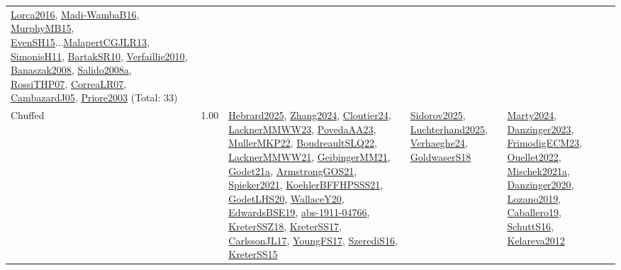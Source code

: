 {\begin{longtable}{p{3cm}r>{\raggedright\arraybackslash}p{6cm}>{\raggedright\arraybackslash}p{6cm}>{\raggedright\arraybackslash}p{8cm}}
\hyperref[detail:Lorca2016]{Lorca2016}, \hyperref[detail:Madi-WambaB16]{Madi-WambaB16}, \hyperref[detail:MurphyMB15]{MurphyMB15}, \hyperref[detail:EvenSH15]{EvenSH15}...\hyperref[detail:MalapertCGJLR13]{MalapertCGJLR13}, \hyperref[detail:SimonisH11]{SimonisH11}, \hyperref[detail:BartakSR10]{BartakSR10}, \hyperref[detail:Verfaillie2010]{Verfaillie2010}, \hyperref[detail:Banaszak2008]{Banaszak2008}, \hyperref[detail:Salido2008a]{Salido2008a}, \hyperref[detail:RossiTHP07]{RossiTHP07}, \hyperref[detail:CorreaLR07]{CorreaLR07}, \hyperref[detail:CambazardJ05]{CambazardJ05}, \hyperref[detail:Priore2003]{Priore2003} (Total: 33)\\
\index{Chuffed}\index{CPSystems!Chuffed}Chuffed &  1.00 & \hyperref[detail:Hebrard2025]{Hebrard2025}, \hyperref[detail:Zhang2024]{Zhang2024}, \hyperref[detail:Cloutier24]{Cloutier24}, \hyperref[detail:LacknerMMWW23]{LacknerMMWW23}, \hyperref[detail:PovedaAA23]{PovedaAA23}, \hyperref[detail:MullerMKP22]{MullerMKP22}, \hyperref[detail:BoudreaultSLQ22]{BoudreaultSLQ22}, \hyperref[detail:LacknerMMWW21]{LacknerMMWW21}, \hyperref[detail:GeibingerMM21]{GeibingerMM21}, \hyperref[detail:Godet21a]{Godet21a}, \hyperref[detail:ArmstrongGOS21]{ArmstrongGOS21}, \hyperref[detail:Spieker2021]{Spieker2021}, \hyperref[detail:KoehlerBFFHPSSS21]{KoehlerBFFHPSSS21}, \hyperref[detail:GodetLHS20]{GodetLHS20}, \hyperref[detail:WallaceY20]{WallaceY20}, \hyperref[detail:EdwardsBSE19]{EdwardsBSE19}, \hyperref[detail:abs-1911-04766]{abs-1911-04766}, \hyperref[detail:KreterSSZ18]{KreterSSZ18}, \hyperref[detail:KreterSS17]{KreterSS17}, \hyperref[detail:CarlssonJL17]{CarlssonJL17}, \hyperref[detail:YoungFS17]{YoungFS17}, \hyperref[detail:SzerediS16]{SzerediS16}, \hyperref[detail:KreterSS15]{KreterSS15} & \hyperref[detail:Sidorov2025]{Sidorov2025}, \hyperref[detail:Luchterhand2025]{Luchterhand2025}, \hyperref[detail:Verhaeghe24]{Verhaeghe24}, \hyperref[detail:GoldwaserS18]{GoldwaserS18} & \hyperref[detail:Marty2024]{Marty2024}, \hyperref[detail:Danzinger2023]{Danzinger2023}, \hyperref[detail:FrimodigECM23]{FrimodigECM23}, \hyperref[detail:Ouellet2022]{Ouellet2022}, \hyperref[detail:Mischek2021a]{Mischek2021a}, \hyperref[detail:Danzinger2020]{Danzinger2020}, \hyperref[detail:Lozano2019]{Lozano2019}, \hyperref[detail:Caballero19]{Caballero19}, \hyperref[detail:SchuttS16]{SchuttS16}, \hyperref[detail:Kelareva2012]{Kelareva2012}\\

\end{longtable}}
